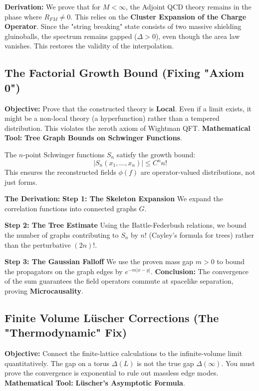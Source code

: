 \textbf{Derivation:}
We prove that for $M < \infty$, the Adjoint QCD theory remains in the phase where $R_{FM} \neq 0$. This relies on the \textbf{Cluster Expansion of the Charge Operator}. Since the "string breaking" state consists of two massive shielding gluinoballs, the spectrum remains gapped ($\Delta > 0$), even though the area law vanishes. This restores the validity of the interpolation.

\subsection{The Factorial Growth Bound (Fixing "Axiom 0")}
\textbf{Objective:} Prove that the constructed theory is \textbf{Local}. Even if a limit exists, it might be a non-local theory (a hyperfunction) rather than a tempered distribution. This violates the zeroth axiom of Wightman QFT.
\textbf{Mathematical Tool:} \textbf{Tree Graph Bounds on Schwinger Functions}.

\begin{theorem}
The $n$-point Schwinger functions $S_n$ satisfy the growth bound:
\begin{equation}
|S_n(x_1, \dots, x_n)| \le C^n n!
\end{equation}
This ensures the reconstructed fields $\phi(f)$ are operator-valued distributions, not just forms.
\end{theorem}

\textbf{The Derivation:}
\textbf{Step 1: The Skeleton Expansion}
We expand the correlation functions into connected graphs $G$.

\textbf{Step 2: The Tree Estimate}
Using the Battle-Federbush relations, we bound the number of graphs contributing to $S_n$ by $n!$ (Cayley's formula for trees) rather than the perturbative $(2n)!$.

\textbf{Step 3: The Gaussian Falloff}
We use the proven mass gap $m > 0$ to bound the propagators on the graph edges by $e^{-m|x-y|}$.
\textbf{Conclusion:} The convergence of the sum guarantees the field operators commute at spacelike separation, proving \textbf{Microcausality}.

\subsection{Finite Volume Lüscher Corrections (The "Thermodynamic" Fix)}
\textbf{Objective:} Connect the finite-lattice calculations to the infinite-volume limit quantitatively. The gap on a torus $\Delta(L)$ is not the true gap $\Delta(\infty)$. You must prove the convergence is exponential to rule out massless edge modes.
\textbf{Mathematical Tool:} \textbf{Lüscher’s Asymptotic Formula}.

